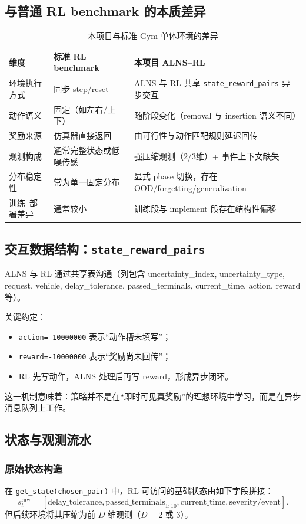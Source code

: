 ﻿\documentclass[11pt,a4paper]{ctexart}
\begin{document}
\subsection{与普通 RL benchmark 的本质差异}
\begin{table}[H]
\centering
\caption{本项目与标准 Gym 单体环境的差异}
\begin{tabular}{p{4.2cm}p{5.2cm}p{5.2cm}}
\toprule
维度 & 标准 RL benchmark & 本项目 ALNS--RL \\
\midrule
环境执行方式 & 同步 step/reset & ALNS 与 RL 共享 \texttt{state\_reward\_pairs} 异步交互 \\
动作语义 & 固定（如左右/上下） & 随阶段变化（removal 与 insertion 语义不同） \\
奖励来源 & 仿真器直接返回 & 由可行性与动作匹配规则延迟回传 \\
观测构成 & 通常完整状态或低噪传感 & 强压缩观测（2/3维）+ 事件上下文缺失 \\
分布稳定性 & 常为单一固定分布 & 显式 phase 切换，存在 OOD/forgetting/generalization \\
训练--部署差异 & 通常较小 & 训练段与 implement 段存在结构性偏移 \\
\bottomrule
\end{tabular}
\end{table}

\subsection{交互数据结构：\texttt{state\_reward\_pairs}}
ALNS 与 RL 通过共享表沟通（列包含 uncertainty\_index, uncertainty\_type, request, vehicle, delay\_tolerance, passed\_terminals, current\_time, action, reward 等）。

关键约定：
\begin{itemize}
  \item \texttt{action=-10000000} 表示“动作槽未填写”；
  \item \texttt{reward=-10000000} 表示“奖励尚未回传”；
  \item RL 先写动作，ALNS 处理后再写 reward，形成异步闭环。
\end{itemize}

这一机制意味着：策略并不是在“即时可见真奖励”的理想环境中学习，而是在异步消息队列上工作。

\subsection{状态与观测流水}
\subsubsection{原始状态构造}
在 \texttt{get\_state(chosen\_pair)} 中，RL 可访问的基础状态由如下字段拼接：
\begin{equation}
s_t^{\text{raw}}=[\text{delay\_tolerance},\text{passed\_terminals}_{1:10},\text{current\_time},\text{severity/event}].
\end{equation}
但后续环境将其压缩为前 $D$ 维观测（$D=2$ 或 $3$）。
\end{document}
